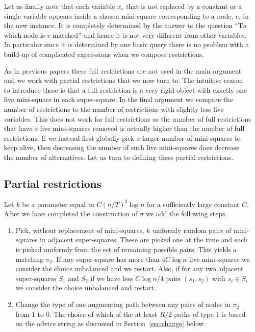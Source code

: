 \documentclass{theoretics}
\begin{document}
Let us finally note that each variable $x_e$ that is
not replaced by a constant or a single variable
appears inside a chosen mini-square corresponding
to a node, $v$, in the new instance.  It is completely
determined by the answer to the question ``To which node
is $v$ matched'' and hence it is not very different from
other variables.  In particular since it is determined by
one basic query there is no problem with a build-up
of complicated expressions when we compose restrictions.

As in previous papers these full restrictions
are not used in the main argument and we work
with partial restrictions that we now turn to.
The intuitive reason to introduce these 
is that a full restriction is a very rigid object with exactly
one live mini-square in each super-square.  In the final
argument we compare the number of restrictions to the
number of restrictions with slightly less live variables.
This does not work for full restrictions as the number
of full restrictions that have $s$ live mini-squares 
removed is actually higher than the number of full
restrictions.   If we instead first globally pick
a larger number of mini-squares to keep alive,
then decreasing the number of such live mini-squares
does decrease the number of alternatives. Let us
turn to defining these partial restrictions.

\subsection{Partial restrictions}

Let $k$ be a parameter equal to $C (n/T)^2 \log n$
for a sufficiently large constant $C$.  After
we have completed the construction of $\sigma$
we add the following steps.  \label{distribution}

\begin{enumerate}

\item Pick, without replacement of mini-squares, $k$ uniformly
random pairs of mini-squares in adjacent super-squares.  
These are picked one at the time and each is picked uniformly
from the set of remaining possible pairs.
This yields a matching $\pi_2$.  If any super-square   
has more than $4C \log n$ live mini-squares
we consider the choice unbalanced and we restart.
Also, if for any two adjacent super-squares $S_1$ and $S_2$ 
if we have less $C \log n/4$ 
pairs $(s_1,s_2)$ with $s_i \in S_i$ we consider the choice
unbalanced and
restart.

\item Change the type of one augmenting path between
any pairs of nodes in $\pi_2$ from $1$ to $0$.  The choice of which of
the at least $R/2$ paths of type $1$ is based
on the advice string as discussed in Section~\ref{sec:change}
below.

\end{enumerate}
\end{document}

